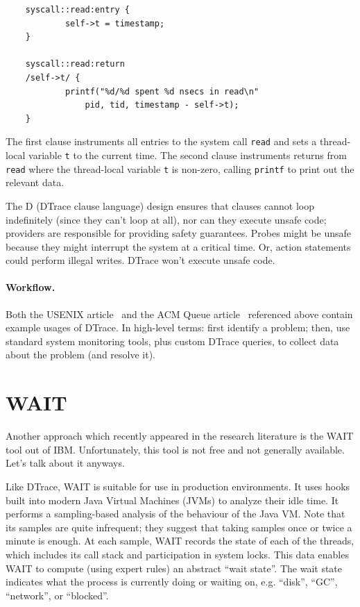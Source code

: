 \documentclass[a4paper]{report}
\begin{document}
{ \begin{verbatim}
    syscall::read:entry {
            self->t = timestamp;
    }

    syscall::read:return
    /self->t/ {
            printf("%d/%d spent %d nsecs in read\n"
                pid, tid, timestamp - self->t);
    }
    \end{verbatim}
}

The first clause instruments all entries to the system call {\tt read}
and sets a thread-local variable {\tt t} to the current time. The
second clause instruments returns from {\tt read} where the
thread-local variable {\tt t} is non-zero, calling {\tt printf} to print out
the relevant data.

The D (DTrace clause language) design ensures that clauses cannot loop indefinitely
(since they can't loop at all), nor can they execute unsafe code;
providers are responsible for providing safety guarantees. Probes
might be unsafe because they might interrupt the system at a critical
time. Or, action statements could perform illegal writes. DTrace won't 
execute unsafe code.

\paragraph{Workflow.} Both the USENIX article~\cite{Cantrill:2004:DIP:1247415.1247417} and the
ACM Queue article~\cite{300ps} referenced above contain example usages of DTrace.
In high-level terms: first identify a problem; then, use
standard system monitoring tools, plus custom DTrace queries,
to collect data about the problem (and resolve it).

\section*{WAIT}
Another approach which recently appeared in the research literature is
the WAIT tool out of IBM. Unfortunately, this tool is not free and not
generally available. Let's talk about it anyways.

Like DTrace, WAIT is suitable for use in production environments. It
uses hooks built into modern Java Virtual Machines (JVMs) to analyze
their idle time. It performs a sampling-based analysis of the
behaviour of the Java VM. Note that its samples are quite infrequent;
they suggest that taking samples once or twice a minute is enough.  At
each sample, WAIT records the state of each of the threads, which
includes its call stack and participation in system locks. This data
enables WAIT to compute (using expert rules) an abstract ``wait
state''.  The wait state indicates what the process is currently doing
or waiting on, e.g. ``disk'', ``GC'', ``network'', or ``blocked''.
\end{document}
